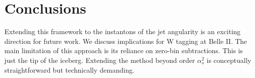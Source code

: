 \section{Conclusions}\label{sec:conclusions}

Extending this framework to the instantons of the jet angularity is an
exciting direction for future work. We discuss implications for W
tagging at Belle II. The main limitation of this approach is its
reliance on zero-bin subtractions. This is just the tip of the iceberg.
Extending the method beyond order $\alpha_s^2$ is conceptually
straightforward but technically demanding.

